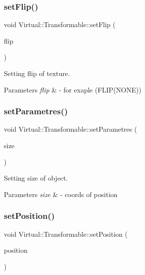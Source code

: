 \subsubsection{\texorpdfstring{set\+Flip()}{setFlip()}}
{\footnotesize\ttfamily void Virtual\+::\+Transformable\+::set\+Flip (\begin{DoxyParamCaption}\item[{S\+D\+L\+\_\+\+Renderer\+Flip}]{flip }\end{DoxyParamCaption})}



Setting flip of texture. 


\begin{DoxyParams}{Parameters}
{\em flip} & -\/ for exaple (F\+L\+I\+P(\+N\+O\+N\+E)) \\
\hline
\end{DoxyParams}
\hypertarget{class_virtual_1_1_transformable_a67d42e58b8f2fc45b565aa51e3f29f67}{}\label{class_virtual_1_1_transformable_a67d42e58b8f2fc45b565aa51e3f29f67} 
\subsubsection{\texorpdfstring{set\+Parametres()}{setParametres()}}
{\footnotesize\ttfamily void Virtual\+::\+Transformable\+::set\+Parametres (\begin{DoxyParamCaption}\item[{\hyperlink{struct_virtual_1_1_vector2}{Vector2}$<$ int $>$}]{size }\end{DoxyParamCaption})}



Setting size of object. 


\begin{DoxyParams}{Parameters}
{\em size} & -\/ coords of position \\
\hline
\end{DoxyParams}
\hypertarget{class_virtual_1_1_transformable_a2c1168cb1d892fbddd978c7d45dfcba9}{}\label{class_virtual_1_1_transformable_a2c1168cb1d892fbddd978c7d45dfcba9} 
\subsubsection{\texorpdfstring{set\+Position()}{setPosition()}}
{\footnotesize\ttfamily void Virtual\+::\+Transformable\+::set\+Position (\begin{DoxyParamCaption}\item[{\hyperlink{struct_virtual_1_1_vector2}{Vector2}$<$ int $>$}]{position }\end{DoxyParamCaption})}



